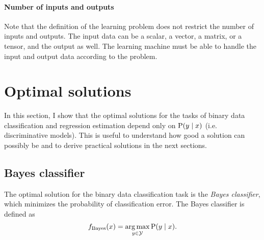\paragraph{Number of inputs and outputs}
Note that the definition of the learning problem does not restrict the number of inputs
and outputs.  The input data can be a scalar, a vector, a matrix, or a tensor, and the
output as well.  The learning machine must be able to handle the input and output data
according to the problem.


\section{Optimal solutions}
\label{sec:optimal-solution}

In this section, I show that the optimal solutions for the tasks of binary data
classification and regression estimation depend only on $\operatorname{P}(y \mid x)$ (i.e.
discriminative models).  This is useful
to understand how good a solution can possibly be and to derive practical solutions in the
next sections.

\subsection{Bayes classifier}

The optimal solution for the binary data classification task is the \emph{Bayes
classifier}, which minimizes the probability of classification error.  The Bayes
classifier is defined as
\begin{equation*}
  f_\text{Bayes}(x) = \operatorname*{arg\,max}_{y \in \mathcal{Y}} \operatorname{P}(y \mid x)\text{.}
\end{equation*}

